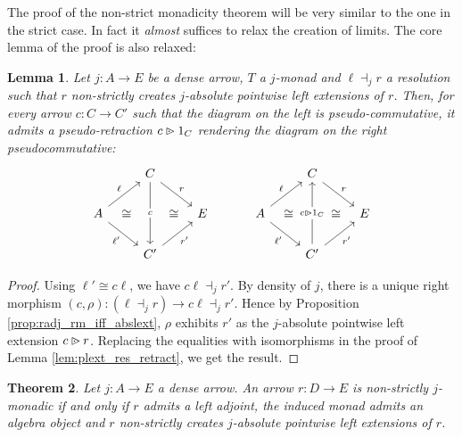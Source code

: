 \documentclass[10pt,a4paper]{article}
\newcommand{\plext}{\mathbin{{\rhd}\mathclap{\mspace{-17.5mu}\cdot}}}
\newcommand{\simeqq}{\cong}
\theoremstyle{plain}
\newtheorem{theorem}{Theorem}[subsection]
\newtheorem{lemma}[theorem]{Lemma}
\theoremstyle{definition}
\theoremstyle{remark}
\begin{document}
The proof of the non-strict monadicity theorem will be very similar to the one in the strict case. In fact it \textit{almost} suffices to relax the creation of limits. The core lemma of the proof is also relaxed:

\begin{lemma}
    \label{lem:plext_res_pseudo_retract}
    Let $j : A \to E$ be a dense arrow, $T$ a $j$-monad and $\ell\dashv_jr$ a resolution such that $r$ non-strictly creates $j$-absolute pointwise left extensions of $r$. Then, for every arrow $c : C \to C'$ such that the diagram on the left is pseudo-commutative, it admits a pseudo-retraction $c\plext 1_C$ rendering the diagram on the right pseudocommutative:
    \[\begin{tikzcd}
        & \ar[dd, "c"{description}] C \ar[dr, "r"] &\\
        A \ar[ur, "\ell"] \ar[dr, "\ell'"'] &{}& E\\
        & C' \ar[ur, "r'"']
        \ar[from=2-1, to=2-2, phantom, "\simeqq"{anchor=center}] \ar[from=2-2, to=2-3, phantom, "\simeqq"{anchor=center}]
    \end{tikzcd}
    \hspace{3em}
    \begin{tikzcd}
        & C \ar[dr, "r"] &\\
        A \ar[ur, "\ell"] \ar[dr, "\ell'"'] &{}& E\\
        & \ar[uu, "c\plext 1_C"{description}] C' \ar[ur, "r'"']
        \ar[from=2-1, to=2-2, phantom, "\simeqq"{anchor=center}] \ar[from=2-2, to=2-3, phantom, "\simeqq"{anchor=center}]
    \end{tikzcd}\]
\end{lemma}

\begin{proof}
    Using $\ell'\simeqq c\ell$, we have $c\ell\dashv_jr'$. By density of $j$, there is a unique right morphism $(c, \rho) : (\ell\dashv_jr) \to c\ell\dashv_jr'$. Hence by Proposition \ref{prop:radj_rm_iff_abslext}, $\rho$ exhibits $r'$ as the $j$-absolute pointwise left extension $c\plext r$. Replacing the equalities with isomorphisms in the proof of Lemma \ref{lem:plext_res_retract}, we get the result.
\end{proof}

\begin{theorem}
    \label{th:non_strict_monadicity}
    Let $j : A \to E$ a dense arrow. An arrow $r : D \to E$ is non-strictly $j$-monadic if and only if $r$ admits a left adjoint, the induced monad admits an algebra object and $r$ non-strictly creates $j$-absolute pointwise left extensions of $r$.
\end{theorem}
\end{document}

